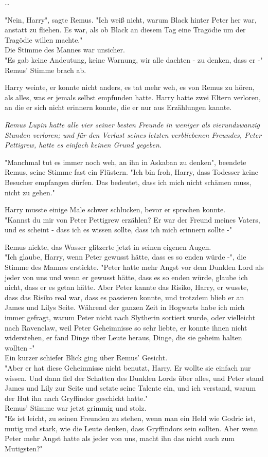 {…

"Nein, Harry", sagte Remus. "Ich weiß nicht, warum Black hinter Peter her war, anstatt zu fliehen. Es war, als ob Black an diesem Tag eine Tragödie um der Tragödie willen machte."\\ Die Stimme des Mannes war unsicher.\\ "Es gab keine Andeutung, keine Warnung, wir alle dachten - zu denken, dass er -"\\ Remus' Stimme brach ab.

Harry weinte, er konnte nicht anders, es tat mehr weh, es von Remus zu hören, als alles, was er jemals selbst empfunden hatte. Harry hatte zwei Eltern verloren, an die er sich nicht erinnern konnte, die er nur aus Erzählungen kannte.

\emph{Remus Lupin hatte alle vier seiner besten Freunde in weniger als vierundzwanzig Stunden verloren; und für den Verlust seines letzten verbliebenen Freundes, Peter Pettigrew, hatte es einfach keinen Grund gegeben.}

"Manchmal tut es immer noch weh, an ihn in Askaban zu denken", beendete Remus, seine Stimme fast ein Flüstern. "Ich bin froh, Harry, dass Todesser keine Besucher empfangen dürfen. Das bedeutet, dass ich mich nicht schämen muss, nicht zu gehen."

Harry musste einige Male schwer schlucken, bevor er sprechen konnte.\\ "Kannst du mir von Peter Pettigrew erzählen? Er war der Freund meines Vaters, und es scheint - dass ich es wissen sollte, dass ich mich erinnern sollte -"

Remus nickte, das Wasser glitzerte jetzt in seinen eigenen Augen.\\ "Ich glaube, Harry, wenn Peter gewusst hätte, dass es so enden würde -", die Stimme des Mannes erstickte. "Peter hatte mehr Angst vor dem Dunklen Lord als jeder von uns und wenn er gewusst hätte, dass es so enden würde, glaube ich nicht, dass er es getan hätte. Aber Peter kannte das Risiko, Harry, er wusste, dass das Risiko real war, dass es passieren konnte, und trotzdem blieb er an James und Lilys Seite. Während der ganzen Zeit in Hogwarts habe ich mich immer gefragt, warum Peter nicht nach Slytherin sortiert wurde, oder vielleicht nach Ravenclaw, weil Peter Geheimnisse so sehr liebte, er konnte ihnen nicht widerstehen, er fand Dinge über Leute heraus, Dinge, die sie geheim halten wollten -"\\ Ein kurzer schiefer Blick ging über Remus' Gesicht.\\ "Aber er hat diese Geheimnisse nicht benutzt, Harry. Er wollte sie einfach nur wissen. Und dann fiel der Schatten des Dunklen Lords über alles, und Peter stand James und Lily zur Seite und setzte seine Talente ein, und ich verstand, warum der Hut ihn nach Gryffindor geschickt hatte."\\ Remus' Stimme war jetzt grimmig und stolz.\\ "Es ist leicht, zu seinen Freunden zu stehen, wenn man ein Held wie Godric ist, mutig und stark, wie die Leute denken, dass Gryffindors sein sollten. Aber wenn Peter mehr Angst hatte als jeder von uns, macht ihn das nicht auch zum Mutigsten?"

}
